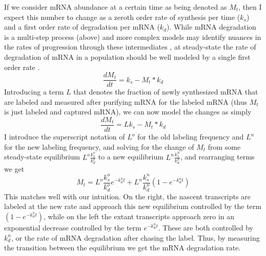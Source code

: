 If we consider mRNA abundance at a
certain time as being denoted as $M_t$, then I expect this number to
change as a zeroth order rate of synthesis per time ($k_s$) and a
first order rate of degradation per mRNA ($k_d$). While mRNA
degradation is a multi-step process (above) and more complex models
may identify nuances in the rates of progression through these
intermediates \parencite{deneke2013complex}, at steady-state the rate of
degradation of mRNA in a population should be well modeled by a single
first order rate \parencite{thattai2016universal}.
$$\frac{dM_t}{dt} = k_s - M_t*k_d$$ Introducing a term $L$ that
denotes the fraction of newly synthesized mRNA that are labeled and
measured after purifying mRNA for the labeled mRNA (thus $M_t$ is just
labeled and captured mRNA), we can now model the changes as simply
$$\frac{dM_t}{dt} = L k_s - M_t*k_d$$ I introduce the superscript
notation of $L^o$ for the old labeling frequency and $L^n$ for the new
labeling frequency, and solving for the change of $M_t$ from some
steady-state equilibrium $L^o \frac{k_s^o}{k_d^o}$ to a new
equilibrium $L^n \frac{k_s^n}{k_d^n}$, and rearranging terms we get
$$M_t =  L^o \frac{k_s^o}{k_d^o} e^{-k_d^n t} + L^n \frac{k_s^n}{k_d^n} ( 1- e^{-k_d^n t} )$$ 
This matches well with our
intuition. On the right, the nascent transcripts are labeled at the
new rate and approach this new equilibrium controlled by the term $(
1- e^{-k_d^n t} )$, while on the left the extant transcripts approach
zero in an exponential decrease controlled by the term $e^{-k_d^n t}$.
These are both controlled by $k_d^n$, or the rate of mRNA degradation
after chasing the label. Thus, by measuring the transition between the
equilibrium we get the mRNA degradation rate.

